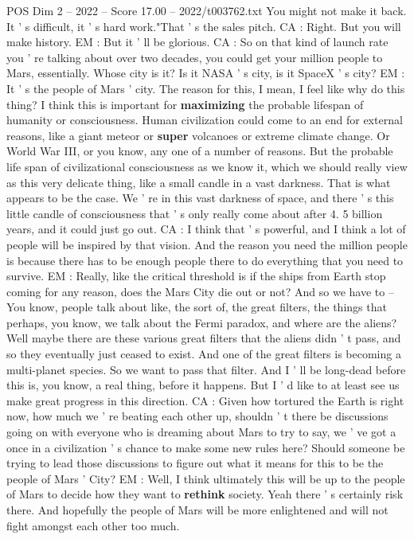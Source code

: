 \begin{textsample}{POS Dim 2 – 2022 – Score 17.00 – 2022/t003762.txt}
You might not make it back.
It ' s difficult, it ' s hard work."That ' s the sales pitch.
CA : Right.
But you will make history.
EM : But it ' ll be glorious.
CA : So on that kind of launch rate you ' re talking about over two decades, you could get your million people to Mars, essentially.
Whose city is it?
Is it NASA ' s city, is it SpaceX ' s city?
EM : It ' s the people of Mars ' city.
The reason for this, I mean, I feel like why do this thing?
I think this is important for \textbf{maximizing} the probable lifespan of humanity or consciousness.
Human civilization could come to an end for external reasons, like a giant meteor or \textbf{super} volcanoes or extreme climate change.
Or World War III, or you know, any one of a number of reasons.
But the probable life span of civilizational consciousness as we know it, which we should really view as this very delicate thing, like a small candle in a vast darkness.
That is what appears to be the case.
We ' re in this vast darkness of space, and there ' s this little candle of consciousness that ' s only really come about after 4. 5 billion years, and it could just go out.
CA : I think that ' s powerful, and I think a lot of people will be inspired by that vision.
And the reason you need the million people is because there has to be enough people there to do everything that you need to survive.
EM : Really, like the critical threshold is if the ships from Earth stop coming for any reason, does the Mars City die out or not?
And so we have to -- You know, people talk about like, the sort of, the great filters, the things that perhaps, you know, we talk about the Fermi paradox, and where are the aliens?
Well maybe there are these various great filters that the aliens didn ' t pass, and so they eventually just ceased to exist.
And one of the great filters is becoming a multi-planet species.
So we want to pass that filter.
And I ' ll be long-dead before this is, you know, a real thing, before it happens.
But I ' d like to at least see us make great progress in this direction.
CA : Given how tortured the Earth is right now, how much we ' re beating each other up, shouldn ' t there be discussions going on with everyone who is dreaming about Mars to try to say, we ' ve got a once in a civilization ' s chance to make some new rules here?
Should someone be trying to lead those discussions to figure out what it means for this to be the people of Mars ' City?
EM : Well, I think ultimately this will be up to the people of Mars to decide how they want to \textbf{rethink} society.
Yeah there ' s certainly risk there.
And hopefully the people of Mars will be more enlightened and will not fight amongst each other too much.

\end{textsample}
